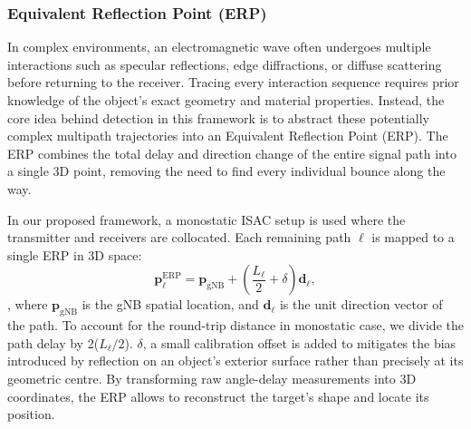 \subsubsection{Equivalent Reflection Point (ERP)}
\label{subsubsec:equivalent-reflection-points}

In complex environments, an electromagnetic wave often undergoes multiple interactions such as specular reflections, edge diffractions, or diffuse scattering before returning to the receiver.
Tracing every interaction sequence requires prior knowledge of the object's exact geometry and material properties.
Instead, the core idea behind detection in this framework is to abstract these potentially complex multipath trajectories into an Equivalent Reflection Point (ERP).
The ERP combines the total delay and direction change of the entire signal path into a single 3D point, removing the need to find every individual bounce along the way.

In our proposed framework, a monostatic ISAC setup is used where the transmitter and receivers are collocated.
Each remaining path $\ell$ is mapped to a single ERP in 3D space:
\begin{equation}
    \mathbf{p}_\ell^{\mathrm{ERP}}
    = \mathbf{p}_{\mathrm{gNB}}
    + \!\left(\frac{L_\ell}{2} + \delta\right)\mathbf{d}_\ell,
    \label{eq:erp}
\end{equation},
where $\mathbf{p}_{\mathrm{gNB}}$ is the gNB spatial location, and $\mathbf{d}_\ell$ is the unit direction vector of the path.
To account for the round-trip distance in monostatic case, we divide the path delay by 2($L_\ell/2$).
$\delta$, a small calibration offset is added to mitigates the bias introduced by reflection on an object's exterior surface rather than precisely at its geometric centre.
By transforming raw angle-delay measurements into 3D coordinates, the ERP allows to reconstruct the target's shape and locate its position.